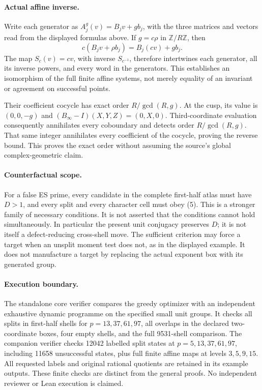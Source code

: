 \paragraph{Actual affine inverse.}
Write each generator as $A_j^g(v)=B_jv+g b_j$, with the three matrices and
vectors read from the displayed formulas above. If $g=c\rho$ in
$\mathbb Z/R\mathbb Z$, then
\[
 c(B_jv+\rho b_j)=B_j(cv)+g b_j.
\]
The map $S_c(v)=cv$, with inverse $S_{c^{-1}}$, therefore intertwines each
generator, all its inverse powers, and every word in the generators.
This establishes an isomorphism of the full finite affine systems, not
merely equality of an invariant or agreement on successful points.

Their coefficient cocycle has exact order $R/\gcd(R,g)$. At the cusp,
its value is $(0,0,-g)$ and
$(B_\infty-I)(X,Y,Z)=(0,X,0)$. Third-coordinate evaluation consequently
annihilates every coboundary and detects order $R/\gcd(R,g)$. That same
integer annihilates every coefficient of the cocycle, proving the reverse
bound. This proves the exact order without assuming the source's global
complex-geometric claim.

\paragraph{Counterfactual scope.}
For a false ES prime, every candidate in the complete first-half atlas
must have $D>1$, and every split and every character cell must obey (5).
This is a stronger family of necessary conditions. It is not asserted that
the conditions cannot hold simultaneously. In particular the present unit
conjugacy preserves $D$; it is not itself a defect-reducing cross-shell move.
The sufficient criterion may force a target when an unsplit moment test
does not, as in the displayed example. It does not manufacture a target by
replacing the actual exponent box with its generated group.

\paragraph{Execution boundary.}
The standalone core verifier compares the greedy optimizer with an
independent exhaustive dynamic programme on the specified small unit groups.
It checks all splits in first-half shells for $p=13,37,61,97$, all overlaps
in the declared two-coordinate boxes, four empty shells, and the full
9531-shell comparison. The companion verifier checks 12042 labelled split
states at $p=5,13,37,61,97$, including 11658 unsuccessful states, plus full
finite affine maps at levels $3,5,9,15$. All requested labels and original
rational quotients are retained in its example outputs. These finite checks
are distinct from the general proofs. No independent reviewer or Lean
execution is claimed.
